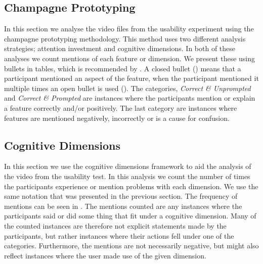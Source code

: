 \subsection{Champagne Prototyping}
In this section we analyse the video files from the usability experiment using the champagne prototyping methodology. This method uses two different analysis strategies; attention investment and cognitive dimensions. In both of these analyses we count mentions of each feature or dimension. We present these using bullets in tables, which is recommended by \cite{blackwell2004champagne}. A closed bullet (\mn) means that a participant mentioned an aspect of the feature, when the participant mentioned it multiple times an open bullet is used (\mns). The categories, \textit{Correct \& Unprompted} and \textit{Correct \& Prompted} are instances where the participants mention or explain a feature correctly and/or positively. The last category are instances where features are mentioned negatively, incorrectly or is a cause for confusion.



\subsection{Cognitive Dimensions}
In this section we use the cognitive dimensions framework to aid the analysis of the video from the usability test. In this analysis we count the number of times the participants experience or mention problems with each dimension. We use the same notation that was presented in the previous section. The frequency of mentions can be seen in . The mentions counted are any instances where the participants said or did some thing that fit under a cognitive dimension. Many of the counted instances are therefore not explicit statements made by the participants, but rather instances where their actions fell under one of the categories. Furthermore, the mentions are not necessarily negative, but might also reflect instances where the user made use of the given dimension.



